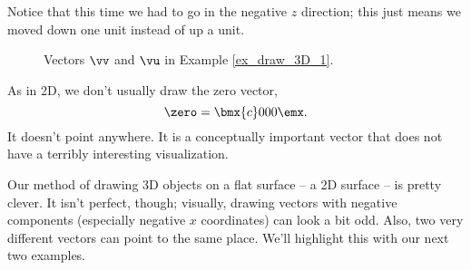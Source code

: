 {Notice that this time we had to go in the negative $z$ direction; this just means we moved down one unit instead of up a unit.

\begin{figure}[h!]
\begin{center}
\end{center}
\caption{Vectors $\protect\vv$ and $\protect\vu$ in Example \ref{ex_draw_3D_1}.}
\label{fig:draw_3D_vx_vy}
\end{figure}

} %

As in 2D, we don't usually draw the zero vector, $$\zero = \bmx{c}0\\0\\0\emx.$$ It doesn't point anywhere. It is a conceptually important vector that does not have a terribly interesting visualization.

Our method of drawing 3D objects on a flat surface -- a 2D surface -- is pretty clever. It isn't perfect, though; visually, drawing vectors with negative components (especially negative $x$ coordinates) can look a bit odd. Also, two very different vectors can point to the same place. We'll highlight this with our next two examples.\\

